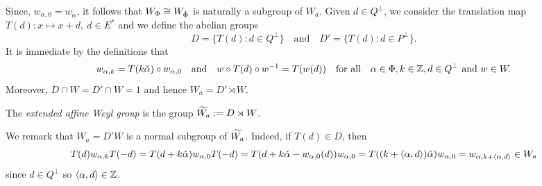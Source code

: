 Since, $w_{\alpha,0}=w_{\check{\alpha}}$, it follows that $W_\Phi\cong W_{\check{\Phi}}$ is naturally a subgroup of $W_a$. Given $d\in Q^\perp$, we consider the translation map $T(d):x\mapsto x+d,\ d\in E^*$ and we define the abelian groups 
$$D=\{T(d):d\in Q^\perp\}\quad\text{and}\quad D'=\{T(d):d\in P^\perp\}.$$
It is immediate by the definitions that $$w_{\alpha,k}=T(k\check{\alpha})\circ w_{\alpha,0}\quad\text{and}\quad w\circ T(d)\circ w^{-1}=T(w(d))\quad \text{for all}\quad\alpha\in\Phi, k\in\mathbb{Z}, d\in Q^\perp\text{ and }w\in W.$$
Moreover, $D\cap W=D'\cap W={1}$ and hence $W_a=D'\rtimes W$.

\begin{definition}
    The \textit{extended affine Weyl group} is the group $\widetilde{W_a}:=D\rtimes W$.
\end{definition}

We remark that $W_a=D'W$ is a normal subgroup of $\eW$. Indeed, if $T(d)\in D$, then $$T(d)w_{\alpha,k}T(-d)=T(d+k\check{\alpha}) w_{\alpha,0}T(-d)=T(d+k\check{\alpha}-w_{\alpha,0}(d))w_{\alpha,0}=T((k+\langle\alpha,d\rangle)\check{\alpha})w_{\alpha,0}=w_{\alpha,k+\langle\alpha,d\rangle}\in W_a$$
since $d\in Q^\perp$ so $\langle\alpha,d\rangle\in\mathbb{Z}$.

\iffalse
\begin{lemma}\label{lem:normalweyl}
    The affine Weyl group $W_a$ is a normal subgroup of the extended affine Weyl group $\eW$. Moreover,
    $$\eW/W\cong D/D'\cong Q^\perp/P^\perp\cong P/Q$$
    is the fundamental group associated to $\Phi$. 
\end{lemma}

\begin{proof}
    Firstly, we note that given any $\sigma=T(d)w\in DW$, we can recover $d\in Q^\perp$ and $w\in W$ by $d=\sigma(0)$ and $w=\sigma\circ(T(-d))$. Then, let $T(d)w\in DW$ and $T(d')w'\in D'W$ for $d\in Q^\perp$ and $d'\in P^\perp$. By the initial observation, $T(d)wT(d')(T(d)w)^{-1}\in D'W$ if and only if
    $$T(d)wT(d')(T(d)w)^{-1}(0)=ww'w^{-1}(-d)+w(d')+d\in P^\perp.$$
    Since $d'\in P^\perp$ and $W$ acts on $P^\perp$, the result follows immediately from the following lemma:
    \begin{lemma}
        Let $d\in Q^\perp$ and $w\in W$. Then $d-w(d)\in P^\perp$.
    \end{lemma}
    \begin{proof}
        Since $Q=\oplus_{i=1}^l\ZZ\epsilon_i^*$ and $w\in W$ is linear, it is enough to prove the result for $d=\epsilon_k^*,1\leq k\leq l$. Furthermore, since $W$ is generated by $\{w_{1},\ldots,w_{l}\}$, where $w_i=w_{\check{\alpha_i}}$, we may write $w=w_{i_1}\cdots w_{i_l}$ as a product of simple reflections. We can express $\epsilon_k^*-w(\epsilon_k^*)$ as a telescopic sum
        $$\epsilon_k^*-w(\epsilon_k^*)=\sum_{j=1}^r w^{(j)}(\epsilon_k^*-w_{i_j}\epsilon_k^*)\text{ where } w^{(j)}=w_{i_1}\cdots w_{i_{j-1}}.$$
        By definition, we have that $\epsilon_k^*-w_{i_j}(\epsilon_k^*)=\langle\epsilon_k^*,\check{\check{\alpha_{i_j}}}\rangle\alpha_{i_j}\in P^\perp$, and since $W$ acts on  $P^\perp$ the result follows.        
    \end{proof}
    This concludes the proof of Lemma \ref{lem:normalweyl}
\end{proof}
\fi

